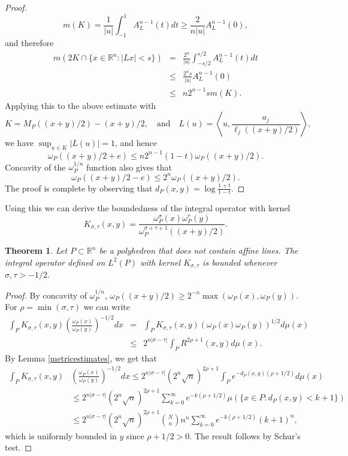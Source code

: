 \documentclass{amsart}
\theoremstyle{plain}
\newtheorem{theo}{Theorem}[section]
\begin{document}
\begin{proof}
	$$m(K)=\frac{1}{|u|}\int_{-1}^{1}A_L^{n-1}(t)dt\geq \frac{2}{n|u|}A_L^{n-1}(0),$$
	and therefore
	\begin{eqnarray}
		m(2K\cap \{x\in\mathbb{R}^{n}:|Lx|<s\})
		&=&\frac{2^n}{|u|}\int_{-s/2}^{s/2}A_L^{n-1}(t)dt\nonumber \\
		&\leq& \frac{2^ns}{|u|}A_L^{n-1}(0)\nonumber \\
		&\leq& n2^{n-1}s m(K). \nonumber 
	\end{eqnarray}
	Applying this to the above estimate with
	$$K=M_P((x+y)/2)-(x+y)/2,\quad \text{and} \quad L(u)=\left\langle u,\frac{a_j}{\ell_j((x+y)/2)}\right\rangle,$$
	we have $\sup_{u\in K}|L(u)|=1$, and hence
	$$\omega_P((x+y)/2+e)\leq n2^{n-1}(1-t)\omega_P((x+y)/2).$$
	Concavity of the $\omega_P^{1/n}$ function also gives that $$\omega_P((x+y)/2-e)\leq 2^n \omega_P((x+y)/2).$$ The proof is complete by observing that $d_P(x,y)=\log\frac{1+t}{1-t}$.
\end{proof}
Using this we can derive the boundedness of the integral operator with kernel $$K_{\sigma,\tau}(x,y)=\frac{\omega_P^\sigma(x)\omega_P^\tau(y)}{\omega_P^{\sigma+\tau+1}((x+y)/2)}.$$

\begin{theo}\label{Kpolyh}
	Let $P\subset\mathbb{R}^n$ be a polyhedron that does not contain affine lines. The integral operator defined on $L^2(P)$ with kernel $K_{\sigma,\tau}$ is bounded whenever $\sigma,\tau>-1/2.$
\end{theo}
\begin{proof}
	By concavity of $\omega_P^{1/n}$, $\omega_P((x+y)/2)\geq 2^{-n}\max(\omega_P(x),\omega_P(y))$. For $\rho=\min(\sigma,\tau)$ we can write
	\begin{eqnarray} 
		\int_{P}K_{\sigma,\tau}(x,y)\left(\frac{\omega_P(x)}{\omega_P(y)}\right)^{-1/2}dx&=&\int_{P}K_{\sigma,\tau}(x,y)(\omega_P(x)\omega_P(y))^{1/2}d\mu(x) \nonumber \\
		&\leq& 2^{n|\sigma-\tau|}\int_{P}R^{2\rho+1}(x,y)d\mu(x).\nonumber
	\end{eqnarray}
	By Lemma \ref{metricestimates}, we get that
	\begin{align*} 
		\int_{P}K_{\sigma,\tau}(x,y)&\left(\frac{\omega_P(x)}{\omega_P(y)}\right)^{-1/2}dx\leq 2^{n|\sigma-\tau|}(2^n\sqrt{n})^{2\rho+1}\int_{P}e^{-d_P(x,y)(\rho+1/2)} d\mu(x)  \\
		&\leq 2^{n|\sigma-\tau|}(2^n\sqrt{n})^{2\rho+1} \sum_{k=0}^{\infty}e^{-k(\rho+1/2)}\mu(\{x\in P:d_P(x,y)<k+1\})  \\
		&\leq  2^{n|\sigma-\tau|}(2^n\sqrt{n})^{2\rho+1}\binom{N}{n}n^n\sum_{k=0}^{\infty}e^{-k(\rho+1/2)} (k+1)^n ,
	\end{align*} 
	which is uniformly bounded in $y$ since $\rho+1/2>0.$ The result follows by Schur's test.
\end{proof}
\end{document}

